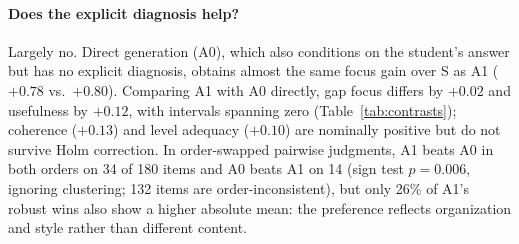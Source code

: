
\paragraph{Does the explicit diagnosis help?} Largely no. Direct generation (A0), which also conditions on the student's answer but has no explicit diagnosis, obtains almost the same focus gain over S as A1 ($+0.78$ vs.\ $+0.80$). Comparing A1 with A0 directly, gap focus differs by $+0.02$ and usefulness by $+0.12$, with intervals spanning zero (Table~\ref{tab:contrasts}); coherence ($+0.13$) and level adequacy ($+0.10$) are nominally positive but do not survive Holm correction. In order-swapped pairwise judgments, A1 beats A0 in both orders on 34 of 180 items and A0 beats A1 on 14 (sign test $p{=}0.006$, ignoring clustering; 132 items are order-inconsistent), but only 26\% of A1's robust wins also show a higher absolute mean: the preference reflects organization and style rather than different content.

